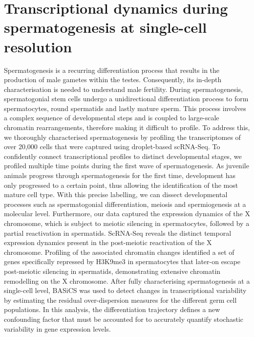
\chapter{Transcriptional dynamics during spermatogenesis at single-cell resolution}  

\graphicspath{{"Figs/Chapter4/"}}

\begin{Abstract}
\hspace{-5mm} Spermatogenesis is a recurring differentiation process that results in the production of male gametes within the testes. 
Consequently, its in-depth characterisation is needed to understand male fertility. 
During spermatogenesis, spermatogonial stem cells undergo a unidirectional differentiation process to form spermatocytes, round spermatids and lastly mature sperm. 
This process involves a complex sequence of developmental steps and is coupled to large-scale chromatin rearrangements, therefore making it difficult to profile. 
To address this, we thoroughly characterised spermatogenesis by profiling the transcriptomes of over 20,000 cells that were captured using droplet-based scRNA-Seq. 
To confidently connect transcriptional profiles to distinct developmental stages, we profiled multiple time points during the first wave of spermatogenesis. 
As juvenile animals progress through spermatogenesis for the first time, development has only progressed to a certain point, thus allowing the identification of the most mature cell type. 
With this precise labelling, we can dissect developmental processes such as spermatogonial differentiation, meiosis and spermiogenesis at a molecular level. 
Furthermore, our data captured the expression dynamics of the X chromosome, which is subject to meiotic silencing in spermatocytes, followed by a partial reactivation in spermatids. 
ScRNA-Seq reveals the distinct temporal expression dynamics present in the post-meiotic reactivation of the X chromosome. 
Profiling of the associated chromatin changes identified a set of genes specifically repressed by H3K9me3 in spermatocytes that later-on escape post-meiotic silencing in spermatids, demonstrating extensive chromatin remodelling on the X chromosome. 
After fully characterising spermatogenesis at a single-cell level, BASiCS was used to detect changes in transcriptional variability by estimating the residual over-dispersion measures for the different germ cell populations. 
In this analysis, the differentiation trajectory defines a new confounding factor that must be accounted for to accurately quantify stochastic variability in gene expression levels.  
\end{Abstract}

